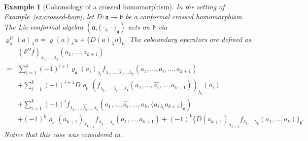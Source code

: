 \documentclass[a4paper,11pt]{article}
\def\Vs{\mathfrak{a}}
\def\Ws{\mathfrak{b}}
\def\rep{\varrho}
\def\la{\lambda}
\numberwithin{equation}{section}
\newtheorem{example}[theorem]{Example}
\begin{document}
\begin{example}[Cohomology of a  crossed homomorphism]\label{ex:coh crossed-hom}
In the setting of Example~\ref{ex:crossed-hom}, let $D:\Vs\to\Ws$ be
a conformal crossed homomorphism.  The Lie conformal 
algebra $(\Vs,\{\cdot_\la\cdot\}_\Vs)$ acts on $\Ws$ via
$\rep^D_\Vs(a)_\la u = \rep(a)_\la u + \{D(a)_\la u\}_\Ws$.
 The coboundary operators are defined as 
\begin{equation*}\label{Coh: crossed homomorphism}
\begin{split}
  &(\delta^D f)_{\la_1,\ldots,\la_k}
  (a_1,\ldots,a_{k+1}) \\
  =& \sum_{i=1}^{k}(-1)^{i+1}
     \rep_\Vs(a_i)_{\la_i}
     f_{\la_1,\ldots,\widehat{\la_i},\ldots \la_k}(a_1,\ldots,\widehat{a_i},\ldots,a_{k+1})
     \\
  &+\sum_{i=1}^{k}(-1)^{i+1}
D\rep_\Ws(f_{\la_1,\ldots,\widehat{\la_i},\ldots \la_k}(a_1,\ldots,\widehat{a_i},\ldots,a_{k+1}))_{\la_i}(a_i)     
     \\
  &
    + \sum_{i=1}^{k}(-1)^i
    f_{\la_1,\ldots,\widehat{\la_i},\ldots \la_k}
      (a_1,\ldots,\widehat{a_i},\ldots,a_k,
       \{a_{i\,\la_i} a_{k+1}\}_\Vs)
      \\ 
      &+(-1)^{k}
     \rep_\Vs(a_{k+1})_{\la_{k+1}}
     f_{\la_1,\ldots \la_k}(a_1,\ldots,a_{k+1})
     +(-1)^{k}
     \{D(a_{k+1})_{\la_{k+1}}
     f_{\la_1,\ldots \la_k}(a_1,\ldots,a_{k})\}_\Ws
 .
\end{split}
\end{equation*}
Notice that this case was considered in \cite{BBSS}.
\end{example}
 
\end{document}
